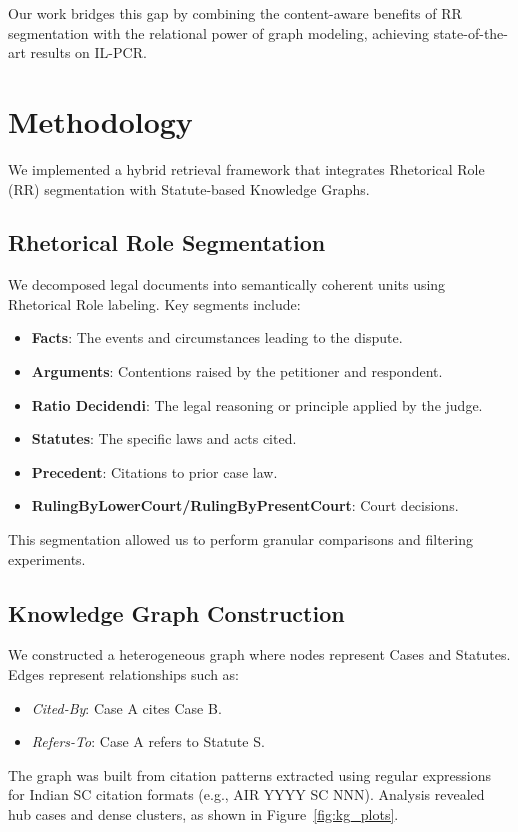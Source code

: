 \documentclass[11pt]{article}
\begin{document}
Our work bridges this gap by combining the content-aware benefits of RR segmentation with the relational power of graph modeling, achieving state-of-the-art results on IL-PCR.

\section{Methodology}

We implemented a hybrid retrieval framework that integrates Rhetorical Role (RR) segmentation with Statute-based Knowledge Graphs.

\subsection{Rhetorical Role Segmentation}
We decomposed legal documents into semantically coherent units using Rhetorical Role labeling. Key segments include:
\begin{itemize}
    \item \textbf{Facts}: The events and circumstances leading to the dispute.
    \item \textbf{Arguments}: Contentions raised by the petitioner and respondent.
    \item \textbf{Ratio Decidendi}: The legal reasoning or principle applied by the judge.
    \item \textbf{Statutes}: The specific laws and acts cited.
    \item \textbf{Precedent}: Citations to prior case law.
    \item \textbf{RulingByLowerCourt/RulingByPresentCourt}: Court decisions.
\end{itemize}
This segmentation allowed us to perform granular comparisons and filtering experiments.

\subsection{Knowledge Graph Construction}
We constructed a heterogeneous graph where nodes represent Cases and Statutes. Edges represent relationships such as:
\begin{itemize}
    \item \textit{Cited-By}: Case A cites Case B.
    \item \textit{Refers-To}: Case A refers to Statute S.
\end{itemize}
The graph was built from citation patterns extracted using regular expressions for Indian SC citation formats (e.g., AIR YYYY SC NNN). Analysis revealed hub cases and dense clusters, as shown in Figure~\ref{fig:kg_plots}.
\end{document}
